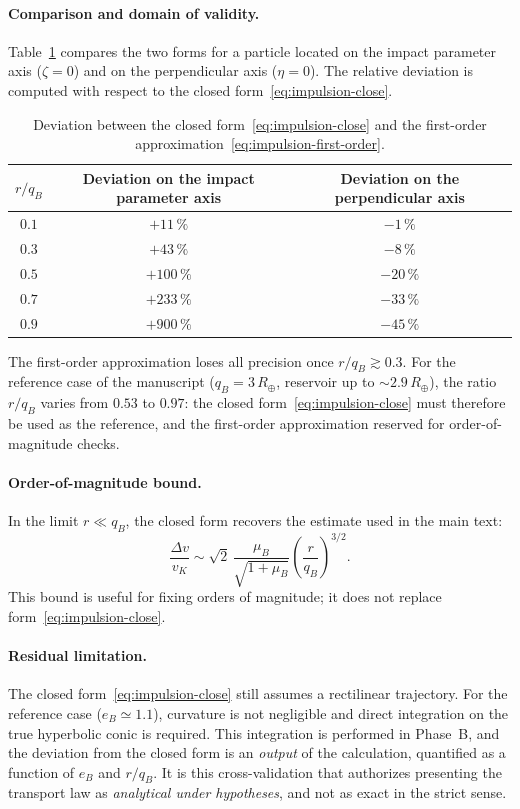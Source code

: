 \documentclass[11pt,a4paper,openany]{report}
\newcommand{\Rt}{R_{\oplus}}
\begin{document}
\paragraph{Comparison and domain of validity.}
Table~\ref{tab:impulsion-validity} compares the two forms for a particle located on the impact
parameter axis ($\zeta=0$) and on the perpendicular axis ($\eta=0$). The relative deviation is
computed with respect to the closed form~\eqref{eq:impulsion-close}.

\begin{table}[htbp]
\centering
\small
\caption{Deviation between the closed form~\eqref{eq:impulsion-close} and the first-order
approximation~\eqref{eq:impulsion-first-order}.}
\label{tab:impulsion-validity}
\begin{tabular}{ccc}
\toprule
$r/q_B$ & Deviation on the impact parameter axis & Deviation on the perpendicular axis \\
\midrule
$0.1$ & $+11\,\%$ & $-1\,\%$ \\
$0.3$ & $+43\,\%$ & $-8\,\%$ \\
$0.5$ & $+100\,\%$ & $-20\,\%$ \\
$0.7$ & $+233\,\%$ & $-33\,\%$ \\
$0.9$ & $+900\,\%$ & $-45\,\%$ \\
\bottomrule
\end{tabular}
\end{table}

The first-order approximation loses all precision once $r/q_B\gtrsim0.3$. For the reference case of
the manuscript ($q_B=3\,\Rt$, reservoir up to $\sim2.9\,\Rt$), the ratio $r/q_B$ varies from $0.53$
to $0.97$: the closed form~\eqref{eq:impulsion-close} must therefore be used as the reference, and
the first-order approximation reserved for order-of-magnitude checks.

\paragraph{Order-of-magnitude bound.}
In the limit $r\ll q_B$, the closed form recovers the estimate used in the main text:
\begin{equation}
\frac{\Delta v}{v_K}\sim\sqrt2\,\frac{\mu_B}{\sqrt{1+\mu_B}}
\left(\frac{r}{q_B}\right)^{3/2}.
\label{eq:impulsion-bound}
\end{equation}
This bound is useful for fixing orders of magnitude; it does not replace
form~\eqref{eq:impulsion-close}.

\paragraph{Residual limitation.}
The closed form~\eqref{eq:impulsion-close} still assumes a rectilinear trajectory. For the reference
case ($e_B\simeq1.1$), curvature is not negligible and direct integration on the true hyperbolic
conic is required. This integration is performed in Phase~B, and the deviation from the closed form
is an \emph{output} of the calculation, quantified as a function of $e_B$ and $r/q_B$. It is this
cross-validation that authorizes presenting the transport law as \emph{analytical under hypotheses},
and not as exact in the strict sense.
\end{document}
